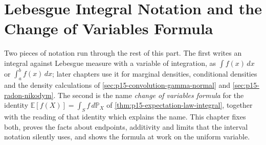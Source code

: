 \chapter{Lebesgue Integral Notation and the Change of Variables Formula}
\label{sec:p15-w02c-p15-001-integral-notation}

Two pieces of notation run through the rest of this part. The first writes
an integral against Lebesgue measure with a variable of integration, as
\(\int f(x)\,dx\) or \(\int_a^b f(x)\,dx\); later chapters use it for
marginal densities, conditional densities and the density calculations of
\cref{sec:p15-convolution-gamma-normal} and \cref{sec:p15-radon-nikodym}.
The second is the name \emph{change of variables formula} for the identity
\(\mathbb E[f(X)]=\int_S f\,d\mathbb P_X\) of
\cref{thm:p15-expectation-law-integral}, together with the reading of
that identity which explains the name. This chapter fixes both, proves the
facts about endpoints, additivity and limits that the interval notation
silently uses, and shows the formula at work on the uniform variable.

